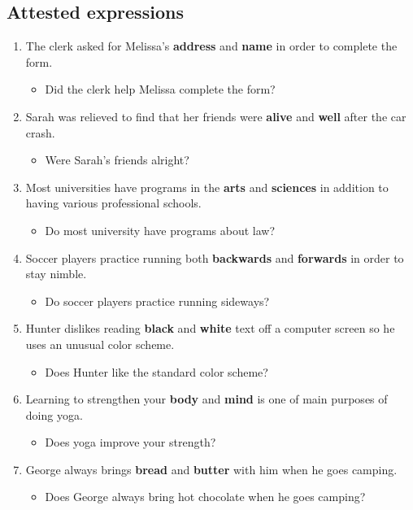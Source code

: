 \documentclass[authoryear]{elsarticle}
\begin{document}
\subsection{Attested expressions}

\begin{enumerate}

\item The clerk asked for Melissa's \textbf{address} and \textbf{name} in order to complete the form.	\begin{itemize} \item Did the clerk help Melissa complete the form?\end{itemize}
\item Sarah was relieved to find that her friends were \textbf{alive} and \textbf{well} after the car crash.	\begin{itemize} \item Were Sarah's friends alright?\end{itemize}
\item Most universities have programs in the \textbf{arts} and \textbf{sciences} in addition to having various professional schools.	\begin{itemize} \item Do most university have programs about law?\end{itemize}
\item Soccer players practice running both \textbf{backwards} and \textbf{forwards} in order to stay nimble.	\begin{itemize} \item Do soccer players practice running sideways?\end{itemize}
\item Hunter dislikes reading \textbf{black} and \textbf{white} text off a computer screen so he uses an unusual color scheme.	\begin{itemize} \item Does Hunter like the standard color scheme?\end{itemize}
\item Learning to strengthen your \textbf{body} and \textbf{mind} is one of main purposes of doing yoga.	\begin{itemize} \item Does yoga improve your strength?\end{itemize}
\item George always brings \textbf{bread} and \textbf{butter} with him when he goes camping.	\begin{itemize} \item Does George always bring hot chocolate when he goes camping?\end{itemize}

\end{enumerate}
\end{document}
